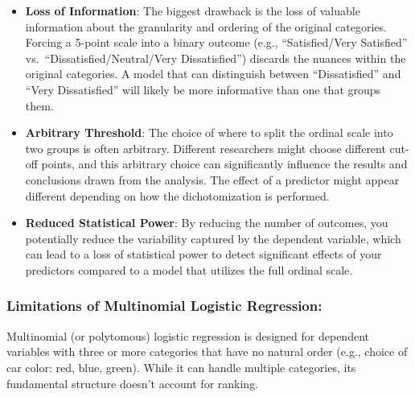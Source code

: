 \documentclass[
  letterpaper,
  DIV=11,
  numbers=noendperiod]{scrartcl}
\begin{document}
\begin{itemize}
\item
  \textbf{Loss of Information}: The biggest drawback is the loss of
  valuable information about the granularity and ordering of the
  original categories. Forcing a 5-point scale into a binary outcome
  (e.g., ``Satisfied/Very Satisfied'' vs.~``Dissatisfied/Neutral/Very
  Dissatisfied'') discards the nuances within the original categories. A
  model that can distinguish between ``Dissatisfied'' and ``Very
  Dissatisfied'' will likely be more informative than one that groups
  them.
\item
  \textbf{Arbitrary Threshold}: The choice of where to split the ordinal
  scale into two groups is often arbitrary. Different researchers might
  choose different cut-off points, and this arbitrary choice can
  significantly influence the results and conclusions drawn from the
  analysis. The effect of a predictor might appear different depending
  on how the dichotomization is performed.
\item
  \textbf{Reduced Statistical Power}: By reducing the number of
  outcomes, you potentially reduce the variability captured by the
  dependent variable, which can lead to a loss of statistical power to
  detect significant effects of your predictors compared to a model that
  utilizes the full ordinal scale.
\end{itemize}

\hypertarget{limitations-of-multinomial-logistic-regression}{%
\subsubsection*{Limitations of Multinomial Logistic
Regression:}\label{limitations-of-multinomial-logistic-regression}}

Multinomial (or polytomous) logistic regression is designed for
dependent variables with three or more categories that have no natural
order (e.g., choice of car color: red, blue, green). While it can handle
multiple categories, its fundamental structure doesn't account for
ranking.
\end{document}
